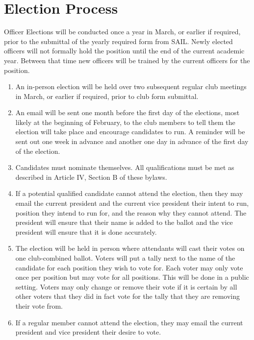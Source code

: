 \documentclass[12pt]{article}
\begin{document}
\section{Election Process}
Officer Elections will be conducted once a year in March, or earlier if required, 
prior to the submittal of the yearly required form from SAIL. 
Newly elected officers will not formally hold the position until the end of the current academic year. 
Between that time new officers will be trained by the current officers for the position.
\begin{enumerate}[label=(\roman*)]
    \item An in-person election will be held over two subsequent regular club meetings in March, 
    or earlier if required, prior to club form submittal. 
    \item An email will be sent one month before the first day of the elections, most likely at the beginning of February, 
    to the club members to tell them the election will take place and encourage candidates to run. 
    A reminder will be sent out one week in advance and another one day in advance of the first day of the election.
    \item Candidates must nominate themselves. 
    All qualifications must be met as described in Article IV, Section B of these bylaws. 
    \item If a potential qualified candidate cannot attend the election, 
    then they may email the current president and the current vice president their intent to run, 
    position they intend to run for, and the reason why they cannot attend. 
    The president will ensure that their name is added to the ballot and the vice president will ensure that it is done accurately.
    \item The election will be held in person where attendants will cast their votes on one club-combined ballot. 
    Voters will put a tally next to the name of the candidate for each position they wish to vote for. 
    Each voter may only vote once per position but may vote for all positions. 
    This will be done in a public setting. 
    Voters may only change or remove their vote if it is certain by all other voters that they did in fact vote for the tally that they are removing their vote from.
    \item If a regular member cannot attend the election, 
    they may email the current president and vice president their desire to vote. 

\end{enumerate}
\end{document}
